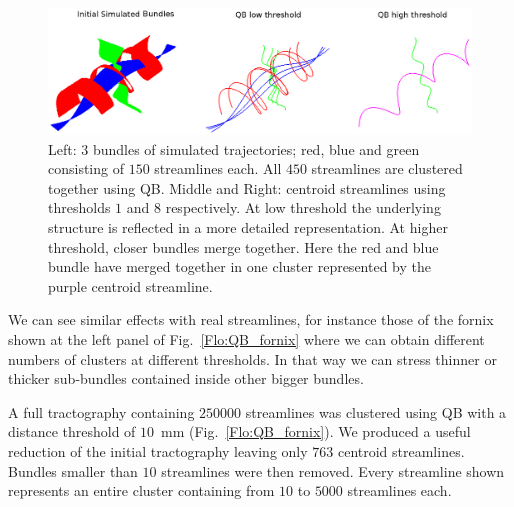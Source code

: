 \documentclass{bioinfo}
\begin{document}
\begin{methods}
\begin{figure}
\begin{centering}
\includegraphics[width=160mm]{Figures/Fig_5_helix_phantom}
\par\end{centering}
\caption{Left: $3$ bundles of simulated trajectories; red, blue and
  green consisting of $150$ streamlines each. All $450$ streamlines are
  clustered together using QB. Middle and Right: centroid streamlines
  using thresholds $1$ and $8$ respectively.  At low threshold the
  underlying structure is reflected in a more detailed
  representation. At higher threshold, closer bundles merge
  together. Here the red and blue bundle have merged together in one
  cluster represented by the purple centroid
  streamline.\label{Flo:simulated_orbits}}
\end{figure}

We can see similar effects with real streamlines, for instance those of
the fornix shown at the left panel of Fig.~\ref{Flo:QB_fornix} where we
can obtain different numbers of clusters at different thresholds. In
that way we can stress thinner or thicker sub-bundles contained inside
other bigger bundles.

A full tractography containing $\num{250000}$ streamlines was clustered
using QB with a distance threshold of $10$~mm
(Fig.~\ref{Flo:QB_fornix}).  We produced a useful reduction of the
initial tractography leaving only $763$ centroid streamlines. Bundles
smaller than $10$ streamlines were then removed. Every streamline shown
represents an entire cluster containing from $10$ to $\num{5000}$
streamlines each.


\end{methods}
\end{document}
